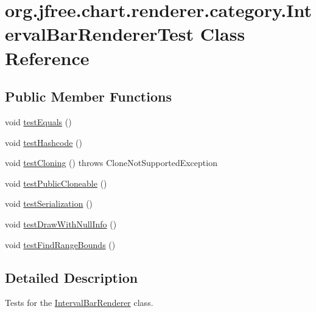 \hypertarget{classorg_1_1jfree_1_1chart_1_1renderer_1_1category_1_1_interval_bar_renderer_test}{}\section{org.\+jfree.\+chart.\+renderer.\+category.\+Interval\+Bar\+Renderer\+Test Class Reference}
\label{classorg_1_1jfree_1_1chart_1_1renderer_1_1category_1_1_interval_bar_renderer_test}
\subsection*{Public Member Functions}
\begin{DoxyCompactItemize}
\item 
void \mbox{\hyperlink{classorg_1_1jfree_1_1chart_1_1renderer_1_1category_1_1_interval_bar_renderer_test_afb9d28e5e4666c11cfd70fea554e6b55}{test\+Equals}} ()
\item 
void \mbox{\hyperlink{classorg_1_1jfree_1_1chart_1_1renderer_1_1category_1_1_interval_bar_renderer_test_a4958573a3c0f80757d90ff00edd50e2e}{test\+Hashcode}} ()
\item 
void \mbox{\hyperlink{classorg_1_1jfree_1_1chart_1_1renderer_1_1category_1_1_interval_bar_renderer_test_abeab1a25bdf96ed019b6ebf12d94b108}{test\+Cloning}} ()  throws Clone\+Not\+Supported\+Exception 
\item 
void \mbox{\hyperlink{classorg_1_1jfree_1_1chart_1_1renderer_1_1category_1_1_interval_bar_renderer_test_ae9e9439582fdbbee4ac43afc26af21da}{test\+Public\+Cloneable}} ()
\item 
void \mbox{\hyperlink{classorg_1_1jfree_1_1chart_1_1renderer_1_1category_1_1_interval_bar_renderer_test_a75d3273407e338a5156fbb3e82cccd95}{test\+Serialization}} ()
\item 
void \mbox{\hyperlink{classorg_1_1jfree_1_1chart_1_1renderer_1_1category_1_1_interval_bar_renderer_test_a64e3a90dd5db2c904c4993ac1a4854ba}{test\+Draw\+With\+Null\+Info}} ()
\item 
void \mbox{\hyperlink{classorg_1_1jfree_1_1chart_1_1renderer_1_1category_1_1_interval_bar_renderer_test_a2e4b8a687b3e7e1d8c6e00ed5427ac05}{test\+Find\+Range\+Bounds}} ()
\end{DoxyCompactItemize}


\subsection{Detailed Description}
Tests for the \mbox{\hyperlink{classorg_1_1jfree_1_1chart_1_1renderer_1_1category_1_1_interval_bar_renderer}{Interval\+Bar\+Renderer}} class. 

